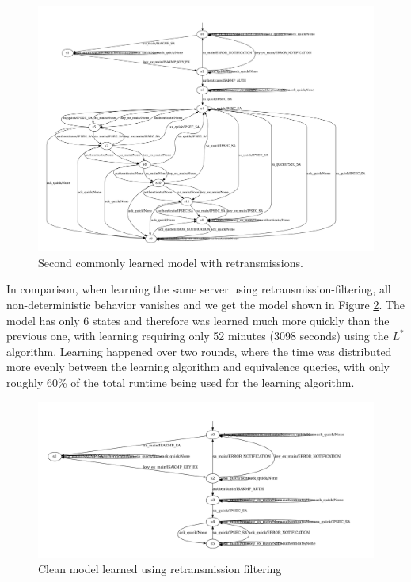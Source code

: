 \begin{figure}[h]
	\centering
	\includegraphics[width=\linewidth]{images/models/retrans_case2_lstar}
	\caption{Second commonly learned model with retransmissions.}
	\label{fig:nofiltera}
\end{figure}

In comparison, when learning the same server using retransmission-filtering, all non-deterministic behavior vanishes and we get the model shown in Figure \ref{fig:reference}. The model has only 6 states and therefore was learned much more quickly than the previous one, with learning requiring only 52 minutes (3098 seconds) using the $L^*$ algorithm. Learning happened over two rounds, where the time was distributed more evenly between the learning algorithm and equivalence queries, with only roughly 60\% of the total runtime being used for the learning algorithm. 

\begin{figure}[h]
	\centering
	\includegraphics[width=\linewidth]{images/models/Reference}
	\caption{Clean model learned using retransmission filtering}
	\label{fig:reference}
\end{figure} 

